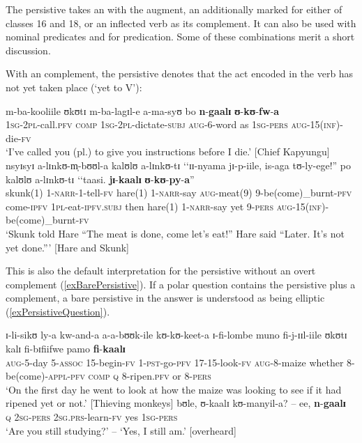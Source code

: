 The persistive  takes an  with the augment, an  additionally marked for either of  classes 16 and 18, or an inflected verb as its complement. It can also be used with nominal predicates and for  predication. Some of these combinations merit a short discussion.

With an  complement, the persistive denotes that the act encoded in the verb has not yet taken place (\lq yet to V'):
\begin{exe}
\ex \gll m-ba-kooliile ʊkʊtɪ m-ba-lagɪl-e a-ma-syʊ bo \textbf{n}-\textbf{gaalɪ} \textbf{ʊ}-\textbf{kʊ}-\textbf{fw}-\textbf{a}\\
\textsc{1sg}-\textsc{2pl}-call.\textsc{pfv} \textsc{comp} \textsc{1sg}-\textsc{2pl}-dictate-\textsc{subj} \textsc{aug}-6-word as \textsc{1sg}-\textsc{pers} \textsc{aug}-15(\textsc{inf})-die-\textsc{fv}\\
\glt `I've called you (pl.) to give you instructions before I die.' [Chief Kapyungu]
\ex \gll nsyɪsyɪ a-lɪnkʊ-m̩-bʊʊl-a kalʊlʊ a-lɪnkʊ-tɪ \textup{\lq\lq}ɪɪ-nyama jɪ-p-iile, is-aga tʊ-ly-ege!\textup{''} po kalʊlʊ a-lɪnkʊ-tɪ \textup{\lq\lq}taasi. \textbf{jɪ}-\textbf{kaalɪ} \textbf{ʊ}-\textbf{kʊ}-\textbf{py}-\textbf{a}\textup{''}\\
skunk(1) 1-\textsc{narr}-1-tell-\textsc{fv} hare(1) 1-\textsc{narr}-say \phantom{\lq\lq}\textsc{aug}-meat(9) 9-be(come)\_burnt-\textsc{pfv} come-\textsc{ipfv} \textsc{1pl}-eat-\textsc{ipfv.subj} then hare(1) 1-\textsc{narr}-say yet 9-\textsc{pers} \textsc{aug}-15(\textsc{inf})-be(come)\_burnt-\textsc{fv}\\
\glt `Skunk told Hare ``The meat is done, come let's eat!'' Hare said ``Later. It's not yet done.''{}' [Hare and Skunk]
\end{exe}

This is also the default interpretation for the persistive without an overt complement (\ref{exBarePersistive}). If a polar question contains the persistive plus a complement, a bare persistive in the answer is understood as being elliptic (\ref{exPersistiveQuestion}).

\begin{exe}
\ex \label{exBarePersistive} \gll ɪ-li-sikʊ ly-a kw-and-a a-a-bʊʊk-ile kʊ-kʊ-keet-a ɪ-fi-lombe muno fi-j-ɪɪl-iile ʊkʊtɪ kalɪ fi-bɪfiifwe pamo \textbf{fi}-\textbf{kaalɪ}\\
\textsc{aug}-5-day 5-\textsc{assoc} 15-begin-\textsc{fv} 1-\textsc{pst}-go-\textsc{pfv} 17-15-look-\textsc{fv} \textsc{aug}-8-maize whether 8-be(come)-\textsc{appl}-\textsc{pfv} \textsc{comp} \textsc{q} 8-ripen.\textsc{pfv} or 8-\textsc{pers}\\
\glt `On the first day he went to look at how the maize was looking to see if it had ripened yet or not.' [Thieving monkeys]
\ex \label{exPersistiveQuestion}
\gll bʊle, ʊ-kaalɪ kʊ-manyil-a? -- ee, \textbf{n}-\textbf{gaalɪ}\\
\textsc{q} \textsc{2sg}-\textsc{pers} \textsc{2sg.prs}-learn-\textsc{fv} {} yes \textsc{1sg}-\textsc{pers}\\
\glt \lq Are you still studying?' -- \lq Yes, I still am.' [overheard]
\end{exe}

